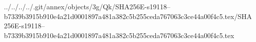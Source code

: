 ../../../../.git/annex/objects/3g/Qk/SHA256E-s19118--b7339b3915b910e4a21d0001897a481a382c5b255ceda767063c3ce44a00f4c5.tex/SHA256E-s19118--b7339b3915b910e4a21d0001897a481a382c5b255ceda767063c3ce44a00f4c5.tex